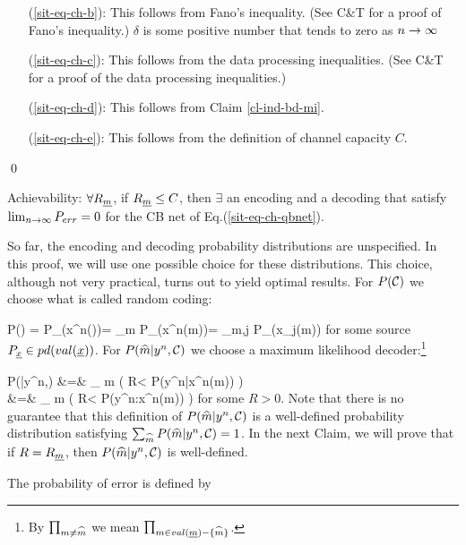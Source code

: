 \begin{itemize}
\item[(\ref{sit-eq-ch-b}):]
This follows from Fano's inequality.
(See C\&T for a proof
of Fano's inequality.)
$\delta$ is some positive number
that tends to zero as $n\rightarrow \infty$

\item[(\ref{sit-eq-ch-c}):] This follows from the data processing
inequalities. (See C\&T for a
proof of the data processing inequalities.)

\item[(\ref{sit-eq-ch-d}):] This
follows from Claim \ref{cl-ind-bd-mi}.


\item[(\ref{sit-eq-ch-e}):] This follows from the definition of
channel capacity $C$.
\end{itemize}
\mbox{\;}
\qed

\begin{claim}
Achievability:
$\forall R_\rvm$,
if $R_\rvm\leq C$, then
$\exists$
an encoding and a decoding
that satisfy $\lim_{n\rightarrow\infty}P_{err}=0$
for the CB net of
Eq.(\ref{sit-eq-ch-qbnet}).
\end{claim}
\proof
So far, the
encoding and decoding probability
distributions are unspecified.
In this proof, we will use one
possible choice
for these distributions. This choice,
although not very practical,
turns out to yield optimal results.
For $P({\cal C})$ we choose what is
called random coding:

\beq
P(\calc) = P_\rvx(x^n(\cdot))=
\prod_{m}
P_\rvx(x^n(m))=
\prod_{m,j}
P_\rvx(x_j(m))
\;
\eeq
for some source $P_\rvx
\in pd(val(\rvx))$.
For
$P({\widehat{m}}|y^n,{\cal C})$
we choose a maximum likelihood
decoder:\footnote{By
$\prod_{ m\neq {\widehat{m}}}$
we mean $\prod_{ m\in val(\rvm)-\{\what{m}\}}$.
}

\beqa
P(|y^n,\calc)
&=&
\prod_{ m\neq {}}
\theta\left(
R< \ln
{}
{P(y^n|x^n(m))}
\right)
\\
&=&
\prod_{ m\neq {}}
\theta\left(
R< \ln
{}
{P(y^n:x^n(m))}
\right)\;
\eeqa
for some $R>0$.
Note that there is no
guarantee that
this definition of $P({\widehat{m}}|y^n,{\cal C})$
is a well-defined probability distribution
satisfying
$\sum_{{\widehat{m}}}P({\widehat{m}}|y^n,{\cal C})=1$.
In the next Claim, we
will prove
that if $R=R_\rvm$,
then $P({\widehat{m}}|y^n,{\cal C})$
is well-defined.

The probability
of error is defined by

